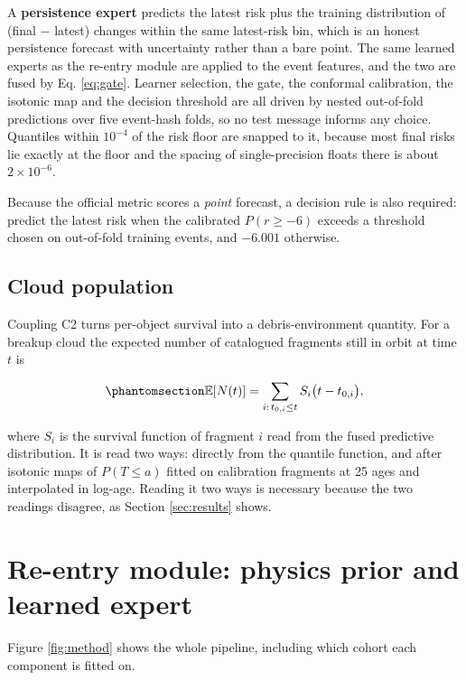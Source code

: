 \documentclass[3p,times,twocolumn]{elsarticle}
\begin{document}
A \textbf{persistence expert} predicts the latest risk plus the training
distribution of (final \(-\) latest) changes within the same latest-risk
bin, which is an honest persistence forecast with uncertainty rather
than a bare point. The same learned experts as the re-entry module are
applied to the event features, and the two are fused by Eq.
\ref{eq:gate}. Learner selection, the gate, the conformal calibration,
the isotonic map and the decision threshold are all driven by nested
out-of-fold predictions over five event-hash folds, so no test message
informs any choice. Quantiles within \(10^{-4}\) of the risk floor are
snapped to it, because most final risks lie exactly at the floor and the
spacing of single-precision floats there is about \(2 \times 10^{-6}\).

Because the official metric scores a \emph{point} forecast, a decision
rule is also required: predict the latest risk when the calibrated
\(P(r \geq -6)\) exceeds a threshold chosen on out-of-fold training
events, and \(-6.001\) otherwise.

\subsection{Cloud population}\label{cloud-population}

Coupling C2 turns per-object survival into a debris-environment
quantity. For a breakup cloud the expected number of catalogued
fragments still in orbit at time \(t\) is

\begin{equation}\protect\phantomsection\label{eq:cloud}{\mathbb{E}[N(t)] = \sum_{i:\, t_{0,i} \leq t} S_i\bigl(t - t_{0,i}\bigr),}\end{equation}

where \(S_i\) is the survival function of fragment \(i\) read from the
fused predictive distribution. It is read two ways: directly from the
quantile function, and after isotonic maps of \(P(T \leq a)\) fitted on
calibration fragments at 25 ages and interpolated in log-age. Reading it
two ways is necessary because the two readings disagree, as Section
\ref{sec:results} shows.

\section{Re-entry module: physics prior and learned
expert}\label{sec:reentry}

Figure \ref{fig:method} shows the whole pipeline, including which cohort
each component is fitted on.
\end{document}
